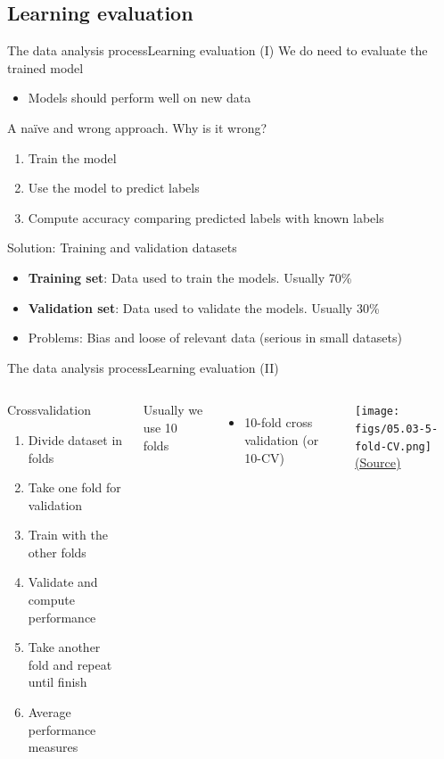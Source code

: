 \documentclass[10pt,compress]{beamer} %
\begin{document}
\subsection{Learning evaluation}
\begin{frame}{The data analysis process}{Learning evaluation (I)}
	We do need to evaluate the trained model
	\begin{itemize}
		\item Models should perform well on new data
	\end{itemize}
	A na\"ive and wrong approach. Why is it wrong?
	\begin{enumerate}
		\item Train the model
		\item Use the model to predict labels
		\item Compute accuracy comparing predicted labels with known labels
	\end{enumerate}
	Solution: Training and validation datasets
	\begin{itemize}
		\item \textbf{Training set}: Data used to train the models. Usually 70\%
		\item \textbf{Validation set}: Data used to validate the models. Usually 30\%
		\item Problems: Bias and loose of relevant data (serious in small datasets)
	\end{itemize}
\end{frame}

\begin{frame}{The data analysis process}{Learning evaluation (II)}
	\begin{columns}
		\begin{block}{Crossvalidation}
			\begin{enumerate}
			\item Divide dataset in folds
			\item Take one fold for validation
			\item Train with the other folds
			\item Validate and compute performance
			\item Take another fold and repeat until finish
			\item Average performance measures
		    \end{enumerate}
		\end{block}

		Usually we use 10 folds 
		\begin{itemize}
			\item 10-fold cross validation (or 10-CV)
		\end{itemize}

		\begin{center}
		\texttt{[image: figs/05.03-5-fold-CV.png]}\\
    	\tiny{\href{https://jakevdp.github.io/PythonDataScienceHandbook/05.03-hyperparameters-and-model-validation.html}{(Source)}}
		\end{center}
	\end{columns}
\end{frame}
\end{document}
